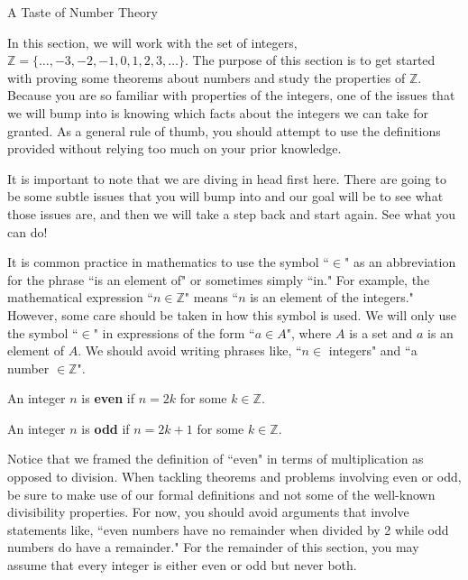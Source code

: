 \begin{section}{A Taste of Number Theory}\label{sec:baby number theory}

In this section, we will work with the set of integers, $\mathbb{Z} = \{\ldots, -3, -2, -1, 0, 1, 2, 3, \ldots\}$.  The purpose of this section is to get started with proving some theorems about numbers and study the properties of $\mathbb{Z}$. Because you are so familiar with properties of the integers, one of the issues that we will bump into is knowing which facts about the integers we can take for granted.  As a general rule of thumb, you should attempt to use the definitions provided without relying too much on your prior knowledge.  %

It is important to note that we are diving in head first here.  There are going to be some subtle issues that you will bump into and our goal will be to see what those issues are, and then we will take a step back and start again.  See what you can do!

It is common practice in mathematics to use the symbol ``$\in$" as an abbreviation for the phrase ``is an element of" or sometimes simply ``in."  For example, the mathematical expression ``$n\in\mathbb{Z}$" means ``$n$ is an element of the integers."  However, some care should be taken in how this symbol is used. We will only use the symbol ``$\in$" in expressions of the form ``$a \in A$", where $A$ is a set and $a$ is an element of $A$.  We should avoid writing phrases like, ``$n \in$ integers" and ``a number $\in \mathbb{Z}$".

\begin{definition}
An integer $n$ is \textbf{even} if $n=2k$ for some $k\in\mathbb{Z}$.
\end{definition}

\begin{definition}
An integer $n$ is \textbf{odd} if $n=2k+1$ for some $k\in\mathbb{Z}$.
\end{definition}

Notice that we framed the definition of ``even" in terms of multiplication as opposed to division. When tackling theorems and problems involving even or odd, be sure to make use of our formal definitions and not some of the well-known divisibility properties.  For now, you should avoid arguments that involve statements like, ``even numbers have no remainder when divided by 2 while odd numbers do have a remainder." For the remainder of this section, you may assume that every integer is either even or odd but never both.


\end{section}
